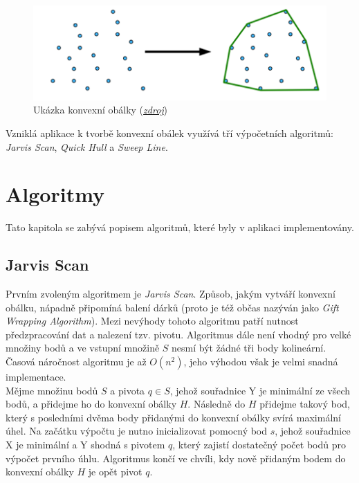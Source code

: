 \documentclass[a4paper, 12pt]{article}
\begin{document}
\begin{figure}[h!]
	\centering
	\includegraphics[width=13cm]{./pictures/ch.png}
	\caption{Ukázka konvexní obálky (\href{http://mind.cs.byu.edu/courses/312/projects/project2_files/ConvexHull_python.php}{\textsl{zdroj}})}
\end{figure}

Vzniklá aplikace k tvorbě konvexní obálek využívá tří výpočetních algoritmů: \textit{Jarvis Scan}, \textit{Quick Hull} a \textit{Sweep Line}. %

\section{Algoritmy}
Tato kapitola se zabývá popisem algoritmů, které byly v aplikaci implementovány. 

\subsection{Jarvis Scan}
Prvním zvoleným algoritmem je \textit{Jarvis Scan}. Způsob, jakým vytváří konvexní obálku, nápadně připomíná balení dárků (proto je též občas nazýván jako \textit{Gift Wrapping Algorithm}). Mezi nevýhody tohoto algoritmu patří nutnost předzpracování dat a nalezení tzv. pivotu. Algoritmus dále není vhodný pro velké množiny bodů a ve vstupní množině $S$ nesmí být žádné tři body kolineární. Časová náročnost algoritmu je až $O(n^2)$, jeho výhodou však je velmi snadná implementace.\\

Mějme množinu bodů $S$ a pivota $q \in S$, jehož souřadnice Y je minimální ze všech bodů, a přidejme ho do konvexní obálky $H$. Následně do $H$ přidejme takový bod, který s posledními dvěma body přidanými do konvexní obálky svírá maximální úhel. Na začátku výpočtu je nutno inicializovat pomocný bod $s$, jehož souřadnice X je minimální a Y shodná s pivotem $q$, který zajistí dostatečný počet bodů pro výpočet prvního úhlu. Algoritmus končí ve chvíli, kdy nově přidaným bodem do konvexní obálky $H$ je opět pivot $q$. \\
\end{document}
